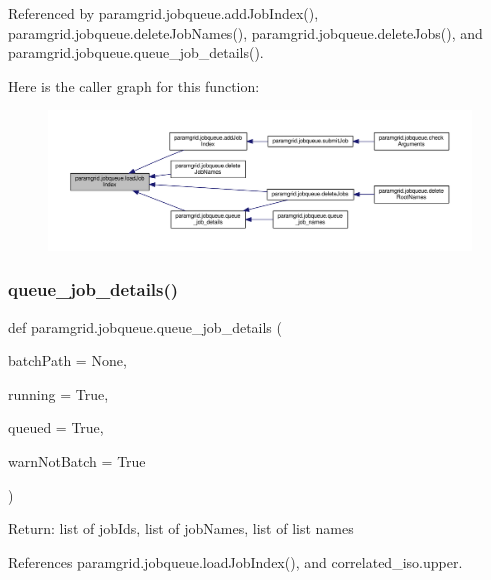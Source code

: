 Referenced by paramgrid.\+jobqueue.\+add\+Job\+Index(), paramgrid.\+jobqueue.\+delete\+Job\+Names(), paramgrid.\+jobqueue.\+delete\+Jobs(), and paramgrid.\+jobqueue.\+queue\+\_\+job\+\_\+details().

Here is the caller graph for this function\+:
\nopagebreak
\begin{figure}[H]
\begin{center}
\leavevmode
\includegraphics[width=350pt]{namespaceparamgrid_1_1jobqueue_a29a41a32b0de4a0554ceeb588e81584c_icgraph}
\end{center}
\end{figure}
\mbox{\label{namespaceparamgrid_1_1jobqueue_af4426f4a1bf4d4051e4c05f6627e9fef}} 
\subsubsection{\texorpdfstring{queue\+\_\+job\+\_\+details()}{queue\_job\_details()}}
{\footnotesize\ttfamily def paramgrid.\+jobqueue.\+queue\+\_\+job\+\_\+details (\begin{DoxyParamCaption}\item[{}]{batch\+Path = {\ttfamily None},  }\item[{}]{running = {\ttfamily True},  }\item[{}]{queued = {\ttfamily True},  }\item[{}]{warn\+Not\+Batch = {\ttfamily True} }\end{DoxyParamCaption})}

\begin{DoxyVerb}Return: list of jobIds, list of jobNames, list of list names
\end{DoxyVerb}
 

References paramgrid.\+jobqueue.\+load\+Job\+Index(), and correlated\+\_\+iso.\+upper.



